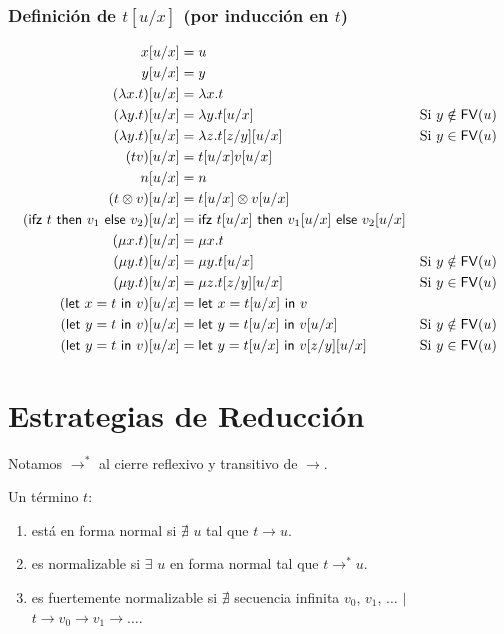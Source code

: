 \documentclass[twoside,a4paper,12pt]{article}
\theoremstyle{definition}
\theoremstyle{remark}
\begin{document}
\newpage
\subsubsection*{Definición de $t[u/x]$ (por inducción en $t$)}

\begin{align*}
  x[u/x] &= u\\
  y[u/x] &= y\\
  (\lambda {x}{.}{t})[u/x] &=\lambda {x}{.}{t}\\
  (\lambda {y}{.}{t})[u/x] &=\lambda {y}{.}{t[u/x]} &\textrm{Si }y\notin \mathsf{FV}(u)\\
  (\lambda {y}{.}{t})[u/x] &=\lambda {z}{.}{t[z/y]}[u/x] &\textrm{Si }y\in \mathsf{FV}(u)\\
  (tv)[u/x] &= t[u/x]v[u/x]\\
  n[u/x] &=n\\
  (t\otimes v)[u/x] &=t[u/x]\otimes v[u/x]\\
  (\mathsf{ifz~}t\mathsf{~then~}v_1\mathsf{~else~}v_2)[u/x] &=\mathsf{ifz~}t[u/x]\mathsf{~then~}v_1[u/x]\mathsf{~else~}v_2[u/x]\\
  (\mathsf{\mu}x.t)[u/x] &=\mathsf{\mu}x.t\\
  (\mathsf{\mu}y.t)[u/x] &=\mathsf{\mu}y.t[u/x] &\textrm{Si } y\notin \mathsf{FV}(u)\\
  (\mathsf{\mu}y.t)[u/x] &=\mathsf{\mu}z.t[z/y][u/x] &\textrm{Si }y\in \mathsf{FV}(u)\\
  (\mathsf{let~}x=t\mathsf{~in~}v)[u/x] &=\mathsf{let~}x=t[u/x]\mathsf{~in~}v\\
  (\mathsf{let~}y=t\mathsf{~in~}v)[u/x] &=\mathsf{let~}y=t[u/x]\mathsf{~in~}v[u/x] &\textrm{Si }y\notin \mathsf{FV}(u)\\
  (\mathsf{let~}y=t\mathsf{~in~}v)[u/x] &=\mathsf{let~}y=t[u/x]\mathsf{~in~}v[z/y][u/x] &\textrm{Si }y\in \mathsf{FV}(u)
\end{align*}

\newpage
\section*{Estrategias de Reducción}

\begin{definicion}{3.1}
  Notamos $\to^*$ al cierre reflexivo y transitivo de $\to$.
\end{definicion}

\begin{definicion}{3.3}
  Un término $t$:
  \begin{enumerate}
  \item está en forma normal si $\nexists$ $u$ tal que $t \to u$.
  \item es normalizable si $\exists$ $u$ en forma normal tal que $t \to^*u$.
  \item es fuertemente normalizable si $\nexists$ secuencia
    infinita $v_0$, $v_1$, $\dots$ $|$ $t\to v_0\to v_1\to\dots$.
  \end{enumerate}
\end{definicion}
\end{document}
